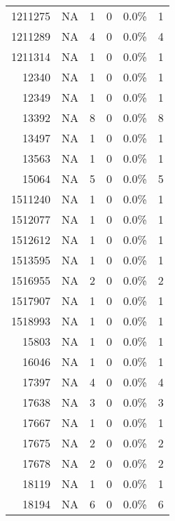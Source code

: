 \begin{longtable}{lrrrrr}
	\multicolumn{1}{r}{1211275} & NA    & 1     & 0     & 0.0\% & 1 \\
	\multicolumn{1}{r}{1211289} & NA    & 4     & 0     & 0.0\% & 4 \\
	\multicolumn{1}{r}{1211314} & NA    & 1     & 0     & 0.0\% & 1 \\
	\multicolumn{1}{r}{12340} & NA    & 1     & 0     & 0.0\% & 1 \\
	\multicolumn{1}{r}{12349} & NA    & 1     & 0     & 0.0\% & 1 \\
	\multicolumn{1}{r}{13392} & NA    & 8     & 0     & 0.0\% & 8 \\
	\multicolumn{1}{r}{13497} & NA    & 1     & 0     & 0.0\% & 1 \\
	\multicolumn{1}{r}{13563} & NA    & 1     & 0     & 0.0\% & 1 \\
	\multicolumn{1}{r}{15064} & NA    & 5     & 0     & 0.0\% & 5 \\
	\multicolumn{1}{r}{1511240} & NA    & 1     & 0     & 0.0\% & 1 \\
	\multicolumn{1}{r}{1512077} & NA    & 1     & 0     & 0.0\% & 1 \\
	\multicolumn{1}{r}{1512612} & NA    & 1     & 0     & 0.0\% & 1 \\
	\multicolumn{1}{r}{1513595} & NA    & 1     & 0     & 0.0\% & 1 \\
	\multicolumn{1}{r}{1516955} & NA    & 2     & 0     & 0.0\% & 2 \\
	\multicolumn{1}{r}{1517907} & NA    & 1     & 0     & 0.0\% & 1 \\
	\multicolumn{1}{r}{1518993} & NA    & 1     & 0     & 0.0\% & 1 \\
	\multicolumn{1}{r}{15803} & NA    & 1     & 0     & 0.0\% & 1 \\
	\multicolumn{1}{r}{16046} & NA    & 1     & 0     & 0.0\% & 1 \\
	\multicolumn{1}{r}{17397} & NA    & 4     & 0     & 0.0\% & 4 \\
	\multicolumn{1}{r}{17638} & NA    & 3     & 0     & 0.0\% & 3 \\
	\multicolumn{1}{r}{17667} & NA    & 1     & 0     & 0.0\% & 1 \\
	\multicolumn{1}{r}{17675} & NA    & 2     & 0     & 0.0\% & 2 \\
	\multicolumn{1}{r}{17678} & NA    & 2     & 0     & 0.0\% & 2 \\
	\multicolumn{1}{r}{18119} & NA    & 1     & 0     & 0.0\% & 1 \\
	\multicolumn{1}{r}{18194} & NA    & 6     & 0     & 0.0\% & 6 \\

\end{longtable}

